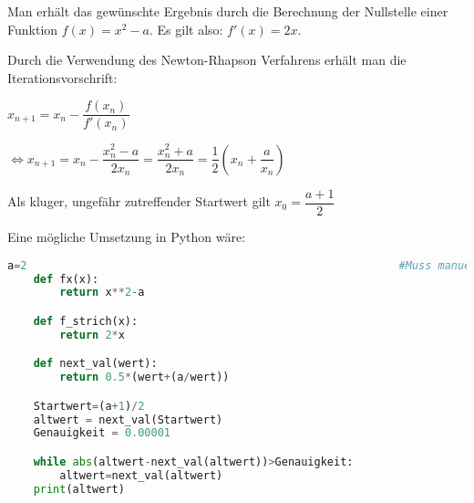 \documentclass[main.tex]{subfiles}
\begin{document}
Man erhält das gewünschte Ergebnis durch die Berechnung der Nullstelle einer Funktion $f(x)=x^{2}-a$. Es gilt also: $f'(x)=2x$.

Durch die Verwendung des Newton-Rhapson Verfahrens erhält man die Iterationsvorschrift:

$x_{n+1}=x_{n}-\dfrac{f(x_{n})}{f'(x_{n})}$

$\Leftrightarrow x_{n+1}=x_{n}-\dfrac{x_{n}^{2}-a}{2x_{n}}=\dfrac{x_{n}^{2}+a}{2x_{n}}=\dfrac{1}{2}\left (x_{n}+\dfrac{a}{x_{n}}\right )$

Als kluger, ungefähr zutreffender Startwert gilt $x_0=\dfrac{a+1}{2}$

Eine mögliche Umsetzung in Python wäre:

\begin{lstlisting}[language=Python]
	a=2															#Muss manuell angegeben werden
	def fx(x):
		return x**2-a

	def f_strich(x):
		return 2*x

	def next_val(wert):
		return 0.5*(wert+(a/wert))

	Startwert=(a+1)/2
	altwert = next_val(Startwert)
	Genauigkeit = 0.00001

	while abs(altwert-next_val(altwert))>Genauigkeit:
		altwert=next_val(altwert)
	print(altwert)
\end{lstlisting}
\end{document}
